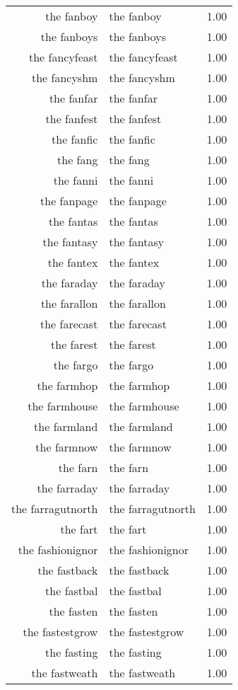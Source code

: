 \begin{table}[ht]
\begin{tabular}{rlr}
  the fanboy & the fanboy & 1.00 \\ 
  the fanboys & the fanboys & 1.00 \\ 
  the fancyfeast & the fancyfeast & 1.00 \\ 
  the fancyshm & the fancyshm & 1.00 \\ 
  the fanfar & the fanfar & 1.00 \\ 
  the fanfest & the fanfest & 1.00 \\ 
  the fanfic & the fanfic & 1.00 \\ 
  the fang & the fang & 1.00 \\ 
  the fanni & the fanni & 1.00 \\ 
  the fanpage & the fanpage & 1.00 \\ 
  the fantas & the fantas & 1.00 \\ 
  the fantasy & the fantasy & 1.00 \\ 
  the fantex & the fantex & 1.00 \\ 
  the faraday & the faraday & 1.00 \\ 
  the farallon & the farallon & 1.00 \\ 
  the farecast & the farecast & 1.00 \\ 
  the farest & the farest & 1.00 \\ 
  the fargo & the fargo & 1.00 \\ 
  the farmhop & the farmhop & 1.00 \\ 
  the farmhouse & the farmhouse & 1.00 \\ 
  the farmland & the farmland & 1.00 \\ 
  the farmnow & the farmnow & 1.00 \\ 
  the farn & the farn & 1.00 \\ 
  the farraday & the farraday & 1.00 \\ 
  the farragutnorth & the farragutnorth & 1.00 \\ 
  the fart & the fart & 1.00 \\ 
  the fashionignor & the fashionignor & 1.00 \\ 
  the fastback & the fastback & 1.00 \\ 
  the fastbal & the fastbal & 1.00 \\ 
  the fasten & the fasten & 1.00 \\ 
  the fastestgrow & the fastestgrow & 1.00 \\ 
  the fasting & the fasting & 1.00 \\ 
  the fastweath & the fastweath & 1.00 \\ 

\end{tabular}
\end{table}
